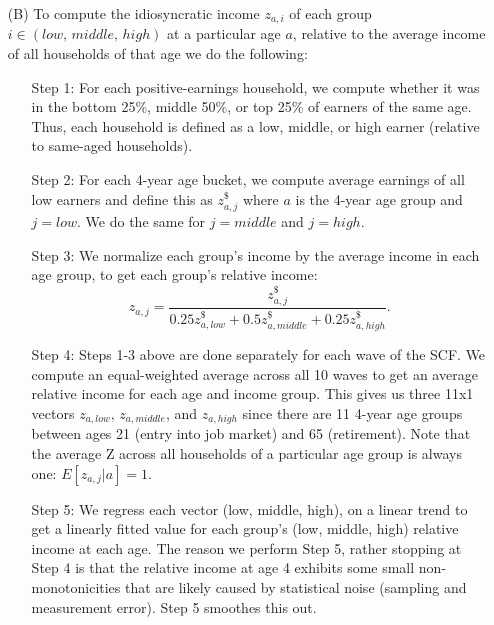 \documentclass[letterpaper,12pt,dvipsnames,usenames]{article}
\theoremstyle{definition}
\begin{document}
\begin{spacing}{1.0}
\begin{small}
\begin{enumerate}
\item[(B)] To compute the idiosyncratic income $z_{a,i}$ of each group $i \in (low, \, middle,\, high)$ at a particular age $a$, relative to the average income of all households of that age we do the following:
\begin{itemize}
\item[Step 1:] For each positive-earnings household, we compute whether it was in the bottom 25\%, middle 50\%, or top 25\% of earners of the same age. Thus, each household is defined as a low, middle, or high earner (relative to same-aged households).
\item[Step 2:] For each 4-year age bucket, we compute average earnings of all low earners and define this as $z^{\$}_{a,j}$ where $a$ is the 4-year age group and $j=low$. We do the same for $j=middle$ and $j=high$.

\item[Step 3:] We normalize each group's income by the average income in each age group, to get each group's relative income:
\[
z_{a,j}=\frac{z^{\$}_{a,j}}{0.25 z^{\$}_{a,low} + 0.5 z^{\$}_{a,middle} + 0.25 z^{\$}_{a,high}}.
\]
\item[Step 4:] Steps 1-3 above are done separately for each wave of the SCF. We compute an equal-weighted average across all 10 waves to get an average relative income for each age and income group. This gives us three 11x1 vectors $z_{a,low}$, $z_{a,middle}$, and $z_{a,high}$ since there are 11 4-year age groups between ages 21 (entry into job market) and 65 (retirement). Note that the average Z across all households of a particular age group is always one: $E[z_{a,j}|a]=1$.

\item[Step 5:] We regress each vector (low, middle, high), on a linear trend to get a linearly fitted value for each group's (low, middle, high) relative income at each age. The reason we perform Step 5, rather stopping at Step 4 is that the relative income at age 4 exhibits some small non-monotonicities that are likely caused by statistical noise (sampling and measurement error). Step 5 smoothes this out.
\end{itemize}



\end{enumerate}
\end{small}
\end{spacing}
\end{document}
